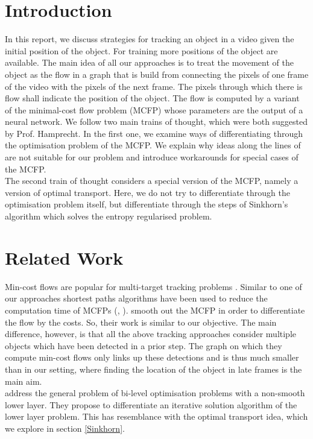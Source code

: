 \documentclass{article}
\begin{document}
\section{Introduction}
In this report, we discuss strategies for tracking an object in a video given the initial position of the object. For training more positions of the object are available. The main idea of all our approaches is to treat the movement of the object as the flow in a graph that is build from connecting the pixels of one frame of the video with the pixels of the next frame. The pixels through which there is flow shall indicate the position of the object. The flow is computed by a variant of the minimal-cost flow problem (MCFP) whose parameters are the output of a neural network. We follow two main trains of thought, which were both suggested by Prof. Hamprecht. In the first one, we examine ways of differentiating through the optimisation problem of the MCFP. We explain why ideas along the lines of \cite{AmosK17} are not suitable for our problem and introduce workarounds for special cases of the MCFP.\\
The second train of thought considers a special version of the MCFP, namely a version of optimal transport. Here, we do not try to differentiate through the optimisation problem itself, but differentiate through the steps of Sinkhorn's algorithm which solves the entropy regularised problem.

\section{Related Work}
Min-cost flows are popular for multi-target tracking problems \cite{zha08}. Similar to one of our approaches shortest paths algorithms have been used to reduce the computation time of MCFPs (\cite{ber11}, \cite{lenz15}). \cite{sch17} smooth out the MCFP in order to differentiate the flow by the costs. So, their work is similar to our objective. The main difference, however, is that all the above tracking approaches consider multiple objects which have been detected in a prior step. The graph on which they compute min-cost flows only links up these detections and is thus much smaller than in our setting, where finding the location of the object in late frames is the main aim.\\
\cite{ochs15} address the general problem of bi-level optimisation problems with a non-smooth lower layer. They propose to differentiate an iterative solution algorithm of the lower layer problem. This has resemblance with the optimal transport idea, which we explore in section \ref{Sinkhorn}. 
\end{document}
